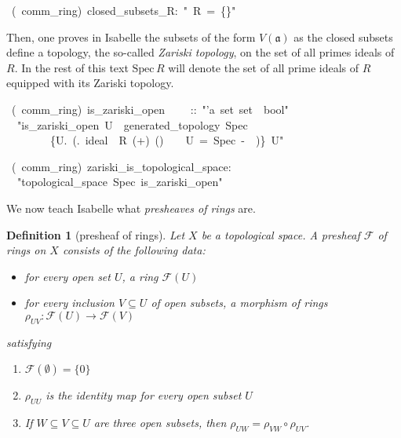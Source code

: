 \documentclass[12pt]{scrartcl}
\newtheorem{definition}[proposition]{Definition}
\begin{document}
\begin{isabelle}
\ (\ comm\_ring)\ closed\_subsets\_R:\ "\isasymV \ R\ =\ \{\}"
\end{isabelle}

Then, one proves in Isabelle the subsets of the form $V(\mathfrak{a})$ as the closed subsets define a topology, the so-called \emph{Zariski topology}\label{zariskitop}, on the set of all primes ideals of $R$. In the rest of this text $\text{Spec}\,R$ will denote the set of all prime ideals of $R$ equipped with its Zariski topology.

\begin{isabelle}
\ (\ comm\_ring)\ is\_zariski\_open\isanewline
\ \ \ \ ::\ "'a\ set\ set\ \isasymRightarrow \ bool"\ \isanewline
\ \ "is\_zariski\_open\ U\ \isasymequiv \ generated\_topology\ Spec\ \isanewline
\ \ \ \ \ \ \ \ \{U.\ (\isasymexists \isasymaa .\ ideal\ \isasymaa \ R\ (+)\ (\isasymcdot )\ \isasymzero \ \isasymone \ \isasymand \ U\ =\ Spec\ -\ \isasymV \ \isasymaa )\}\ U"
\end{isabelle}

\begin{isabelle}
\ (\ comm\_ring)\ zariski\_is\_topological\_space:\isanewline
\ \ "topological\_space\ Spec\ is\_zariski\_open"
\end{isabelle}

We now teach Isabelle what \emph{presheaves of rings} are. 

\begin{definition}[presheaf of rings]
	Let $X$ be a topological space. A presheaf $\mathscr{F}$ of rings on $X$ consists of the following data:
	\begin{itemize}
		\item for every open set $U$, a ring $\mathscr{F}(U)$
		\item for every inclusion $V \subseteq U$ of open subsets, a morphism of rings $\rho_{UV}: \mathscr{F}(U) \rightarrow \mathscr{F}(V)$  
	\end{itemize}
satisfying 
	\begin{enumerate}
		\item $\mathscr{F}(\emptyset) = \lbrace 0 \rbrace$
		\item $\rho_{UU}$ is the identity map for every open subset $U$
		\item  If $W \subseteq V \subseteq U$ are three open subsets, then $\rho_{UW} = \rho_{VW} \circ \rho_{UV}$.
	\end{enumerate}
\end{definition}
\end{document}
